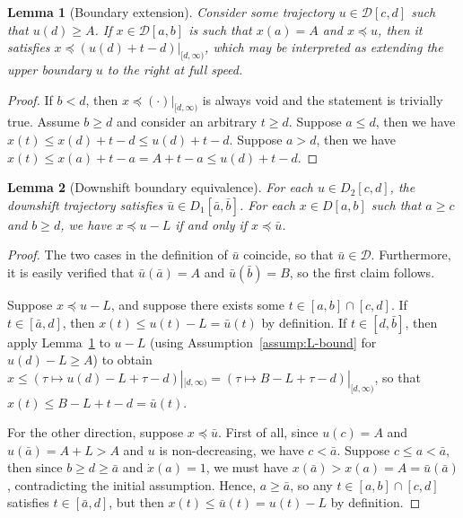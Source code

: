 \documentclass{report}
\theoremstyle{definition}
\theoremstyle{plain}
\newtheorem{lemma}{Lemma}[chapter]
\newcommand\halfopen[2]{\ensuremath{[#1,#2)}}
\begin{document}
\begin{lemma}[Boundary extension]\label{lemma:boundary-extension}
  Consider some trajectory $u \in \mathcal{D}[c,d]$ such that $u(d) \geq A$. If
  $x \in \mathcal{D}[a,b]$ is such that $x(a) = A$ and $x \preceq u$, then it
  satisfies $x \preceq (u(d) + t - d)|_{\halfopen{d}{\infty}}$, which may be
  interpreted as extending the upper boundary $u$ to the right at full speed.
\end{lemma}
\begin{proof}
  If $b < d$, then $x \preceq (\cdot)|_{\halfopen{d}{\infty}}$ is always void and
  the statement is trivially true. Assume $b \geq d$ and consider an arbitrary
  $t \geq d$.
  Suppose $a \leq d$, then we have $x(t) \leq x(d) + t - d \leq u(d) + t - d$.
  Suppose $a > d$, then we have $x(t) \leq x(a) + t - a = A + t - a \leq u(d) + t - d$.
\end{proof}
\begin{lemma}[Downshift boundary equivalence]\label{lemma:downshift}
  For each $u \in D_{2}[c,d]$, the downshift trajectory satisfies
  $\bar{u} \in D_{1}[\bar{a},\bar{b}]$.
  For each $x \in D[a, b]$ such that $a \geq c$ and $b \geq d$, we have
  $x \preceq u - L$ if and only if $x \preceq \bar{u}$.
\end{lemma}
\begin{proof}
  The two cases in the definition of $\bar{u}$ coincide, so that
  $\bar{u} \in \mathcal{D}$. Furthermore, it is easily verified that
  $\bar{u}(\bar{a}) = A$ and $\bar{u}(\bar{b}) = B$, so the first claim
  follows.

  Suppose $x \preceq u - L$, and suppose there exists some
  $t \in [a,b] \cap [c,d]$. If $t \in [\bar{a}, d]$, then
  $x(t) \leq u(t) - L = \bar{u}(t)$ by definition. If $t \in [d, \bar{b}]$, then
  apply Lemma~\ref{lemma:boundary-extension} to $u - L$ (using
  Assumption~\ref{assump:L-bound} for $u(d) - L \geq A$) to obtain
  $x \leq (\tau \mapsto u(d) - L + \tau - d)|_{\halfopen{d}{\infty}} = (\tau \mapsto B - L + \tau - d)|_{\halfopen{d}{\infty}}$,
  so that $x(t) \leq B - L + t - d = \bar{u}(t)$.

  For the other direction, suppose $x \preceq \bar{u}$. First of all, since
  $u(c) = A$ and $u(\bar{a}) = A+L > A$ and $u$ is non-decreasing, we have
  $c < \bar{a}$.
  Suppose $c \leq a < \bar{a}$, then since $b \geq d \geq \bar{a}$ and
  $\dot{x}(a) = 1$, we must have
  $x(\bar{a}) > x(a) = A = \bar{u}(\bar{a})$, contradicting the initial
  assumption.
  Hence, $a \geq \bar{a}$, so any $t \in [a,b] \cap [c,d]$ satisfies
  $t \in [\bar{a}, d]$, but then $x(t) \leq \bar{u}(t) = u(t) - L$ by
  definition.
\end{proof}
\end{document}
